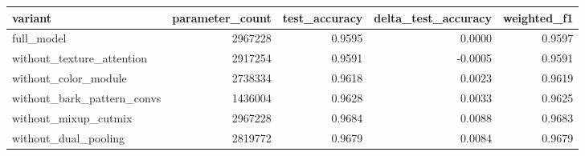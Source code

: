 \begin{tabular}{lrrrr}
\toprule
variant & parameter\_count & test\_accuracy & delta\_test\_accuracy & weighted\_f1 \\
\midrule
full\_model & 2967228 & 0.9595 & 0.0000 & 0.9597 \\
without\_texture\_attention & 2917254 & 0.9591 & -0.0005 & 0.9591 \\
without\_color\_module & 2738334 & 0.9618 & 0.0023 & 0.9619 \\
without\_bark\_pattern\_convs & 1436004 & 0.9628 & 0.0033 & 0.9625 \\
without\_mixup\_cutmix & 2967228 & 0.9684 & 0.0088 & 0.9683 \\
without\_dual\_pooling & 2819772 & 0.9679 & 0.0084 & 0.9679 \\
\bottomrule
\end{tabular}

